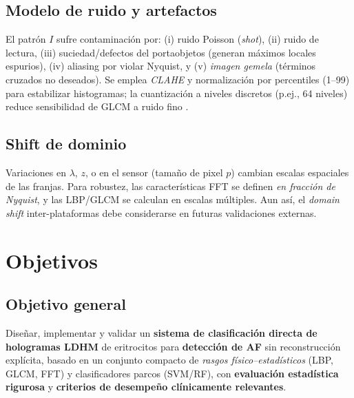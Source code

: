 \subsection{Modelo de ruido y artefactos}
El patrón $I$ sufre contaminación por: (i) ruido Poisson (\emph{shot}), (ii) ruido de lectura, (iii) suciedad/defectos del portaobjetos (generan máximos locales espurios), (iv) aliasing por violar Nyquist, y (v) \emph{imagen gemela} (términos cruzados no deseados). Se emplea \emph{CLAHE} y normalización por percentiles (1–99) para estabilizar histogramas; la cuantización a niveles discretos (p.ej., 64 niveles) reduce sensibilidad de GLCM a ruido fino \cite{Zhou2019MedImageContrast}.

\subsection{Shift de dominio}
Variaciones en $\lambda$, $z$, o en el sensor (tamaño de pixel $p$) cambian escalas espaciales de las franjas. Para robustez, las características FFT se definen \emph{en fracción de Nyquist}, y las LBP/GLCM se calculan en escalas múltiples. Aun así, el \emph{domain shift} inter-plataformas debe considerarse en futuras validaciones externas.

\section{Objetivos}
\subsection{Objetivo general}
Diseñar, implementar y validar un \textbf{sistema de clasificación directa de hologramas LDHM} de eritrocitos para \textbf{detección de AF} sin reconstrucción explícita, basado en un conjunto compacto de \emph{rasgos físico–estadísticos} (LBP, GLCM, FFT) y clasificadores parcos (SVM/RF), con \textbf{evaluación estadística rigurosa} y \textbf{criterios de desempeño clínicamente relevantes}.

